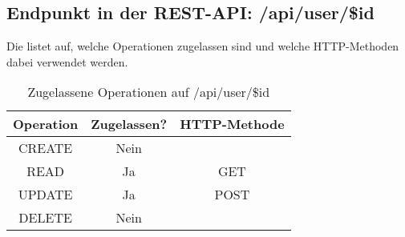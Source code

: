 \subsection{Endpunkt in der REST-API: /api/user/\$id}
Die  listet auf, welche Operationen zugelassen sind und welche HTTP-Methoden dabei verwendet werden. 

\begin{table}[!htbp]
	\begin{tabular}{|c|c|c|}
		\hline
			\textbf{Operation} & \textbf{Zugelassen?} & \textbf{HTTP-Methode} \\ \hline
			CREATE & Nein & \\ \hline  
			READ & Ja & GET \\ \hline
			UPDATE & Ja & POST \\ \hline 
			DELETE & Nein & \\ \hline
	\end{tabular}

		\caption{Zugelassene Operationen auf /api/user/\$id}
		\label{tab:end:rest:api:user:id:meth}
\end{table}

